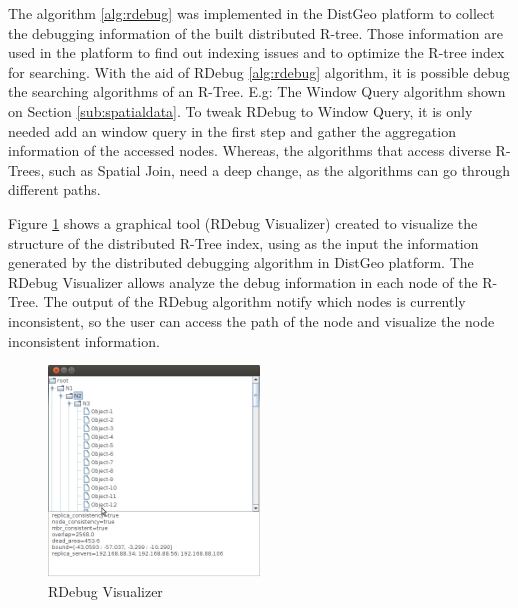The algorithm \ref{alg:rdebug} was implemented in the DistGeo platform to collect the debugging information of the built distributed R-tree. Those information are used in the platform to find out indexing issues and to optimize the R-tree index for searching. With the aid of RDebug \ref{alg:rdebug} algorithm, it is possible debug the searching algorithms of an R-Tree. E.g: The Window Query algorithm shown on Section \ref{sub:spatialdata}. To tweak RDebug to Window Query, it is only needed add an window query in the first step and gather the aggregation information of the accessed nodes. Whereas, the algorithms that access diverse R-Trees, such as Spatial Join, need a deep change, as the algorithms can go through different paths.

Figure \ref{fig:rdebug-vis} shows a graphical tool (RDebug Visualizer) created to visualize the structure of the distributed R-Tree index, using as the input the information generated by the distributed debugging algorithm in DistGeo platform. The RDebug Visualizer allows analyze the debug information in each node of the R-Tree. The output of the RDebug algorithm notify which nodes is currently inconsistent, so the user can access the path of the node and visualize the node inconsistent information.    

\begin{figure}
	\centering
		\includegraphics[width=0.5\textwidth]{rdebug-vis.jpg}
	\caption{RDebug Visualizer}
	\label{fig:rdebug-vis}
\end{figure}


